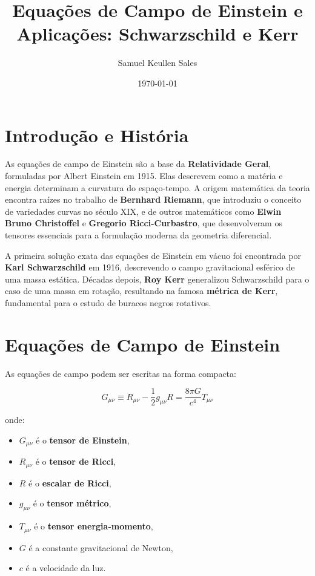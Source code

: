 \documentclass[12pt,a4paper]{article}
\title{Equações de Campo de Einstein e Aplicações: Schwarzschild e Kerr}
\author{Samuel Keullen Sales}
\date{\today}
\begin{document}
\maketitle

\section*{Introdução e História}

As equações de campo de Einstein são a base da \textbf{Relatividade Geral}, formuladas por Albert Einstein em 1915. Elas descrevem como a matéria e energia determinam a curvatura do espaço-tempo. A origem matemática da teoria encontra raízes no trabalho de \textbf{Bernhard Riemann}, que introduziu o conceito de variedades curvas no século XIX, e de outros matemáticos como \textbf{Elwin Bruno Christoffel} e \textbf{Gregorio Ricci-Curbastro}, que desenvolveram os tensores essenciais para a formulação moderna da geometria diferencial.

A primeira solução exata das equações de Einstein em vácuo foi encontrada por \textbf{Karl Schwarzschild} em 1916, descrevendo o campo gravitacional esférico de uma massa estática. Décadas depois, \textbf{Roy Kerr} generalizou Schwarzschild para o caso de uma massa em rotação, resultando na famosa \textbf{métrica de Kerr}, fundamental para o estudo de buracos negros rotativos.

\section*{Equações de Campo de Einstein}

As equações de campo podem ser escritas na forma compacta:

\begin{equation}
G_{\mu\nu} \equiv R_{\mu\nu} - \frac{1}{2} g_{\mu\nu} R = \frac{8\pi G}{c^4} T_{\mu\nu}
\end{equation}

\noindent onde:
\begin{itemize}
    \item $G_{\mu\nu}$ é o \textbf{tensor de Einstein},
    \item $R_{\mu\nu}$ é o \textbf{tensor de Ricci},
    \item $R$ é o \textbf{escalar de Ricci},
    \item $g_{\mu\nu}$ é o \textbf{tensor métrico},
    \item $T_{\mu\nu}$ é o \textbf{tensor energia-momento},
    \item $G$ é a constante gravitacional de Newton,
    \item $c$ é a velocidade da luz.
\end{itemize}
\end{document}
